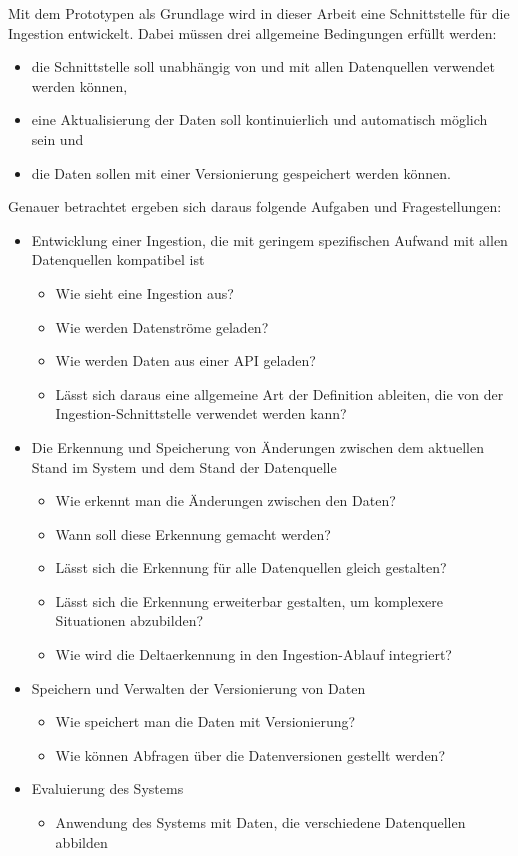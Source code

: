Mit dem Prototypen als Grundlage wird in dieser Arbeit eine Schnittstelle für die Ingestion entwickelt.
Dabei müssen drei allgemeine Bedingungen erfüllt werden: \begin{itemize}
    \item die Schnittstelle soll unabhängig von und mit allen Datenquellen verwendet werden können,
    \item eine Aktualisierung der Daten soll kontinuierlich und automatisch möglich sein und
    \item die Daten sollen mit einer Versionierung gespeichert werden können.
\end{itemize}
Genauer betrachtet ergeben sich daraus folgende Aufgaben und Fragestellungen: \begin{itemize}
    \item Entwicklung einer Ingestion, die mit geringem spezifischen Aufwand mit allen Datenquellen kompatibel ist \begin{itemize}
        \item Wie sieht eine Ingestion aus?
        \item Wie werden Datenströme geladen?
        \item Wie werden Daten aus einer API geladen?
        \item Lässt sich daraus eine allgemeine Art der Definition ableiten, die von der Ingestion-Schnittstelle verwendet werden kann?
    \end{itemize}
    \item Die Erkennung und Speicherung von Änderungen zwischen dem aktuellen Stand im System und dem Stand der Datenquelle \begin{itemize}
        \item Wie erkennt man  die Änderungen zwischen den Daten?
        \item Wann soll diese Erkennung gemacht werden?
        \item Lässt sich die Erkennung für alle Datenquellen gleich gestalten?
        \item Lässt sich die Erkennung erweiterbar gestalten, um komplexere Situationen abzubilden?
        \item Wie wird die Deltaerkennung in den Ingestion-Ablauf integriert?
    \end{itemize}
    \item Speichern und Verwalten der Versionierung von Daten \begin{itemize}
        \item Wie speichert man die Daten mit Versionierung?
        \item Wie können Abfragen über die Datenversionen gestellt werden?
    \end{itemize}
    \item Evaluierung des Systems \begin{itemize}
        \item Anwendung des Systems mit Daten, die verschiedene Datenquellen abbilden
    \end{itemize}
\end{itemize}

